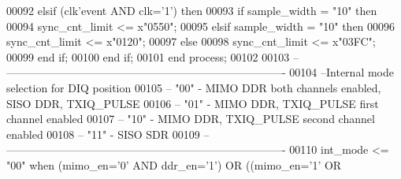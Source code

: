 \begin{DoxyCode}
00092    \textcolor{keywordflow}{elsif} \textcolor{vhdlchar}{(}\textcolor{vhdlchar}{clk}\textcolor{vhdlchar}{'}\textcolor{vhdlkeyword}{event} \textcolor{keywordflow}{AND} \textcolor{vhdlchar}{clk}\textcolor{vhdlchar}{=}\textcolor{vhdlchar}{'}\textcolor{vhdllogic}{}\textcolor{vhdllogic}{1}\textcolor{vhdlchar}{'}\textcolor{vhdlchar}{)} \textcolor{keywordflow}{then} 
00093       \textcolor{keywordflow}{if} \textcolor{vhdlchar}{sample_width} \textcolor{vhdlchar}{=} \textcolor{vhdllogic}{"10"} \textcolor{keywordflow}{then}   
00094          \textcolor{vhdlchar}{sync_cnt_limit} \textcolor{vhdlchar}{<=} \textcolor{vhdlchar}{x}\textcolor{vhdllogic}{"0550"};
00095       \textcolor{keywordflow}{elsif} \textcolor{vhdlchar}{sample_width} \textcolor{vhdlchar}{=} \textcolor{vhdllogic}{"10"} \textcolor{keywordflow}{then} 
00096          \textcolor{vhdlchar}{sync_cnt_limit} \textcolor{vhdlchar}{<=} \textcolor{vhdlchar}{x}\textcolor{vhdllogic}{"0120"};
00097       \textcolor{keywordflow}{else}
00098          \textcolor{vhdlchar}{sync_cnt_limit} \textcolor{vhdlchar}{<=} \textcolor{vhdlchar}{x}\textcolor{vhdllogic}{"03FC"};
00099       \textcolor{keywordflow}{end} \textcolor{keywordflow}{if};
00100    \textcolor{keywordflow}{end} \textcolor{keywordflow}{if};
00101 \textcolor{keywordflow}{end} \textcolor{keywordflow}{process};
00102 
00103 \textcolor{keyword}{-- ----------------------------------------------------------------------------}
00104 \textcolor{keyword}{--Internal mode selection for DIQ position}
00105 \textcolor{keyword}{-- "00" - MIMO DDR both channels enabled, SISO DDR, TXIQ\_PULSE}
00106 \textcolor{keyword}{-- "01" - MIMO DDR, TXIQ\_PULSE first channel enabled}
00107 \textcolor{keyword}{-- "10" - MIMO DDR, TXIQ\_PULSE second channel enabled}
00108 \textcolor{keyword}{-- "11" - SISO SDR }
00109 \textcolor{keyword}{-- ----------------------------------------------------------------------------}
00110  \textcolor{vhdlchar}{int_mode} \textcolor{vhdlchar}{<=} \textcolor{vhdllogic}{"00"} \textcolor{keywordflow}{when} \textcolor{vhdlchar}{(}\textcolor{vhdlchar}{mimo_en}\textcolor{vhdlchar}{=}\textcolor{vhdlchar}{'}\textcolor{vhdllogic}{}\textcolor{vhdllogic}{0}\textcolor{vhdlchar}{'} \textcolor{keywordflow}{AND} \textcolor{vhdlchar}{ddr_en}\textcolor{vhdlchar}{=}\textcolor{vhdlchar}{'}\textcolor{vhdllogic}{}\textcolor{vhdllogic}{1}\textcolor{vhdlchar}{'}\textcolor{vhdlchar}{)} \textcolor{keywordflow}{OR} \textcolor{vhdlchar}{(}\textcolor{vhdlchar}{(}\textcolor{vhdlchar}{mimo_en}\textcolor{vhdlchar}{=}\textcolor{vhdlchar}{'}\textcolor{vhdllogic}{}\textcolor{vhdllogic}{1}\textcolor{vhdlchar}{'} \textcolor{keywordflow}{OR} \textcolor{vhdlchar}{
}
\end{DoxyCode}
